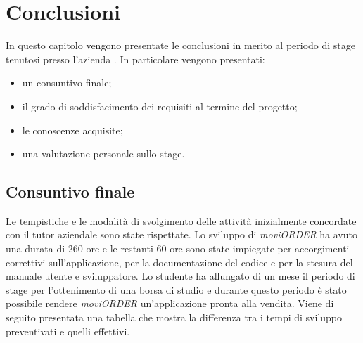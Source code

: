 
\chapter{Conclusioni}
\label{cap:conclusioni}
In questo capitolo vengono presentate le conclusioni in merito al periodo di stage tenutosi presso l'azienda \visione{}. In particolare vengono presentati:
\begin{itemize}
	\item un consuntivo finale;
	\item il grado di soddisfacimento dei requisiti al termine del progetto;
	\item le conoscenze acquisite;
	\item una valutazione personale sullo stage.
\end{itemize}
\section{Consuntivo finale}

Le tempistiche e le modalità di svolgimento delle attività inizialmente concordate con il tutor aziendale sono state rispettate. Lo sviluppo di \textit{moviORDER} ha avuto una durata di 260 ore e le restanti 60 ore sono state impiegate per accorgimenti correttivi sull'applicazione, per la documentazione del codice e per la stesura del manuale utente e sviluppatore. Lo studente ha allungato di un mese il periodo di stage per l'ottenimento di una borsa di studio e durante questo periodo è stato possibile rendere \textit{moviORDER} un'applicazione pronta alla vendita. Viene di seguito presentata una tabella che mostra la differenza tra i tempi di sviluppo preventivati e quelli effettivi.

